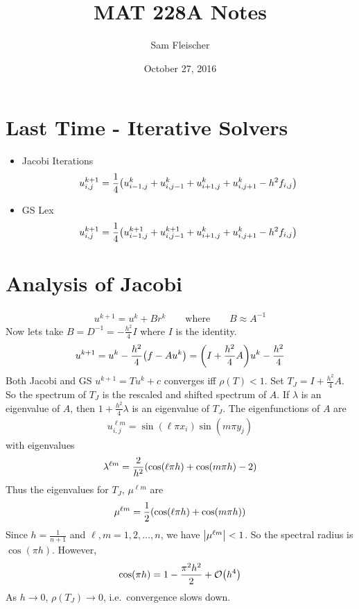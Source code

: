 \documentclass{article}
\title{MAT 228A Notes}
\author{Sam Fleischer}
\date{October 27, 2016}
\begin{document}
    \maketitle

    \section{Last Time - Iterative Solvers}
        \begin{itemize}
            \item Jacobi Iterations
            \begin{align*}
                u_{i,j}^{k+1} = \frac{1}{4}\qty(u_{i-1,j}^k + u_{i,j-1}^k + u_{i+1,j}^k + u_{i,j+1}^k - h^2f_{i,j})
            \end{align*}
            \item GS Lex
            \begin{align*}
                u_{i,j}^{k+1} = \frac{1}{4}\qty(u_{i-1,j}^{k+1} + u_{i,j-1}^{k+1} + u_{i+1,j}^k + u_{i,j+1}^k - h^2f_{i,j})
            \end{align*}
        \end{itemize}

    \section{Analysis of Jacobi}
        \begin{align*}
            u^{k+1} = u^k + Br^k \qquad \text{where} \qquad B \approx A^{-1}
        \end{align*}
        Now lets take $B = D^{-1} = -\frac{h^2}{4}I$ where $I$ is the identity.
        \begin{align*}
            u^{k+1} = u^k - \frac{h^2}{4}\qty(f - Au^k) = \qty(I + \frac{h^2}{4}A)u^k - \frac{h^2}{4}
        \end{align*}
        Both Jacobi and GS $u^{k+1} = Tu^k + c$ converges iff $\rho(T) < 1$.  Set $T_J = I + \frac{h^2}{4}A$.  So the spectrum of $T_J$ is the rescaled and shifted spectrum of $A$.  If $\lambda$ is an eigenvalue of $A$, then $1 + \frac{h^2}{4}\lambda$ is an eigenvalue of $T_J$.  The eigenfunctions of $A$ are
        \begin{align*}
            u_{i,j}^{\ell m} = \sin(\ell \pi x_i)\sin(m \pi y_j)
        \end{align*}
        with eigenvalues
        \begin{align*}
            \lambda^{\ell m} = \frac{2}{h^2}\qty(\cos(\ell \pi h) + \cos(m \pi h) - 2)
        \end{align*}
        Thus the eigenvalues for $T_J$, $\mu^{\ell m}$ are
        \begin{align*}
            \mu^{\ell m} = \frac{1}{2}\qty(\cos(\ell \pi h) + \cos(m \pi h))
        \end{align*}
        Since $h = \frac{1}{n+1}$ and $\ell,m = 1,2,\dots,n$, we have $\abs{\mu^{\ell m}} < 1$.  So the spectral radius is $\cos(\pi h)$.  However,
        \begin{align*}
            \cos(\pi h) = 1 - \frac{\pi^2h^2}{2} + \order{h^4}
        \end{align*}
        As $h \rightarrow 0$, $\rho(T_J) \rightarrow 0$, i.e.~convergence slows down.
\end{document}
